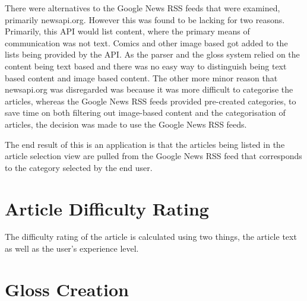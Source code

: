 There were alternatives to the Google News RSS feeds that were examined, primarily newsapi.org. However this was found to be lacking for two reasons. Primarily, this API would list content, where the primary means of communication was not text. Comics and other image based got added to the lists being provided by the API. As the parser and the gloss system relied on the content being text based and there was no easy way to distinguish being text based content and image based content. The other more minor reason that newsapi.org was disregarded was because it was more difficult to categorise the articles, whereas the Google News RSS feeds provided pre-created categories, to save time on both filtering out image-based content and the categorisation of articles, the decision was made to use the Google News RSS feeds. 

The end result of this is an application is that the articles being listed in the article selection view are pulled from the Google News RSS feed that corresponds to the category selected by the end user.

\section{Article Difficulty Rating}

The difficulty rating of the article is calculated using two things, the article text as well as the user's experience level. 


\section{Gloss Creation}